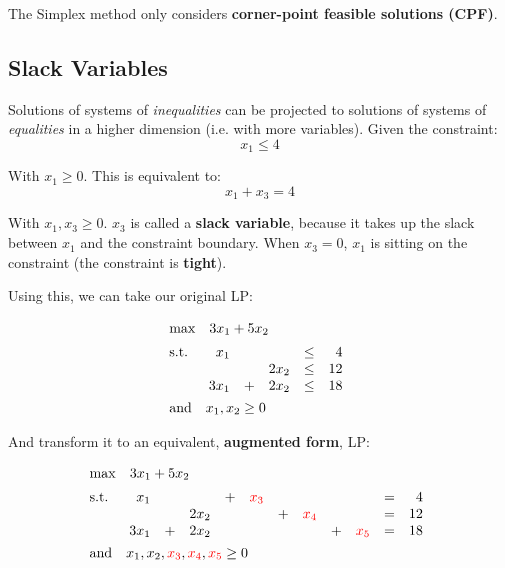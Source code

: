 \documentclass[12pt]{article}
\begin{document}
\noindent
The Simplex method only considers \textbf{corner-point feasible solutions (CPF)}.

\subsection*{Slack Variables}
Solutions of systems of \textit{inequalities} can be projected to solutions of systems of \textit{equalities} in a higher dimension (i.e. with more variables).
Given the constraint:
\[ x_1 \leq 4 \]

\noindent
With $x_1 \geq 0$. This is equivalent to:
\[ x_1 + x_3 = 4 \]

\noindent
With $x_1, x_3 \geq 0$.
$x_3$ is called a \textbf{slack variable}, because it takes up the slack between $x_1$ and the constraint boundary.
When $x_3 = 0$, $x_1$ is sitting on the constraint (the constraint is \textbf{tight}).

\newpage
\noindent
Using this, we can take our original LP:

\begin{align*}
    &\mathrm{max} \quad 3x_1 + 5x_2  \\[2pt]
    &\mathrm{s.t.} \quad 
    \begin{array}[t]{r c r c r}
        x_1 & & & \leq & 4 \\
        &  & 2x_2 & \leq & 12 \\
        3x_1 & + & 2x_2 & \leq & 18
    \end{array}\\
    &\mathrm{and} \quad x_1, x_2 \geq 0
\end{align*}

\noindent
And transform it to an equivalent, \textbf{augmented form}, LP:

\begin{align*}
    &\mathrm{max} \quad 3x_1 + 5x_2  \\[2pt]
    &\mathrm{s.t.} \quad 
    \begin{array}[t]{r c r c r c r c r c r}
        x_1 & & & + & \textcolor{red}{x_3} & & & & & = & 4 \\
        & & 2x_2 & & & + & \textcolor{red}{x_4} & & & = & 12 \\
        3x_1 & + & 2x_2 & & & & & + & \textcolor{red}{x_5} & = & 18
    \end{array}\\
    &\mathrm{and} \quad x_1, x_2, \textcolor{red}{x_3}, \textcolor{red}{x_4}, \textcolor{red}{x_5} \geq 0
\end{align*}
\end{document}
